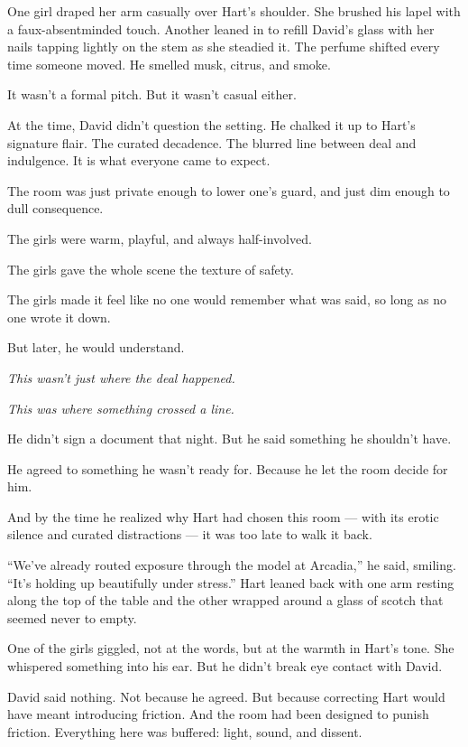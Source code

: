 \medskip


One girl draped her arm casually over Hart’s shoulder. She brushed his lapel with a faux-absentminded touch.  
Another leaned in to refill David’s glass with her nails tapping lightly on the stem as she steadied it.  
The perfume shifted every time someone moved. He smelled musk, citrus, and smoke.  

It wasn’t a formal pitch. But it wasn’t casual either.

At the time, David didn’t question the setting.  
He chalked it up to Hart’s signature flair. The curated decadence. The blurred line between deal and indulgence.
It is what everyone came to expect.  

The room was just private enough to lower one’s guard, and just dim enough to dull consequence.  

The girls were warm, playful, and always half-involved. 

The girls gave the whole scene the texture of safety.  

The girls made it feel like no one would remember what was said, so long as no one wrote it down.

But later, he would understand.

\textit{This wasn’t just where the deal happened.}  

\textit{This was where something crossed a line.}

He didn’t sign a document that night.  
But he said something he shouldn’t have.  

He agreed to something he wasn’t ready for.  
Because he let the room decide for him.

And by the time he realized why Hart had chosen this room ---
with its erotic silence and curated distractions ---  
it was too late to walk it back.

“We’ve already routed exposure through the model at Arcadia,” he said, smiling. 
“It’s holding up beautifully under stress.”
Hart leaned back with one arm resting along the top of the table and the other wrapped around a 
glass of scotch that seemed never to empty. 

One of the girls giggled, not at the words, but at the warmth in Hart’s tone. She whispered something into his ear. 
But he didn’t break eye contact with David.

David said nothing. Not because he agreed. But because correcting Hart would have meant introducing friction. And the 
room had been designed to punish friction. Everything here was buffered: light, sound, and dissent.

